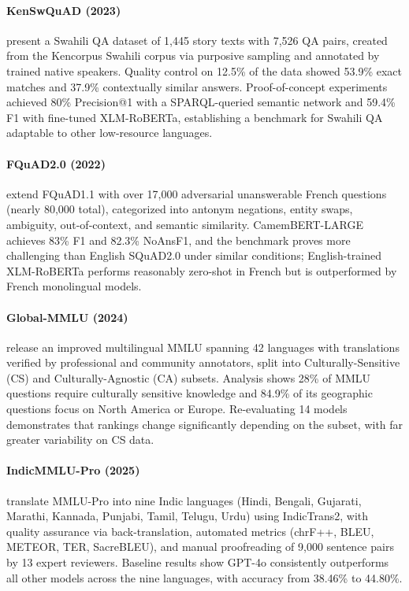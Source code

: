 \documentclass[letterpaper]{article}
\begin{document}
\paragraph{KenSwQuAD (2023)} \citet{10.1145/3578553} present a Swahili QA dataset of 1,445 story texts with 7,526 QA pairs, created from the Kencorpus Swahili corpus via purposive sampling and annotated by trained native speakers. Quality control on 12.5\% of the data showed 53.9\% exact matches and 37.9\% contextually similar answers. Proof-of-concept experiments achieved 80\% Precision@1 with a SPARQL-queried semantic network and 59.4\% F1 with fine-tuned XLM-RoBERTa, establishing a benchmark for Swahili QA adaptable to other low-resource languages.

\paragraph{FQuAD2.0 (2022)} \citet{heinrich-etal-2022-fquad2} extend FQuAD1.1 with over 17,000 adversarial unanswerable French questions (nearly 80,000 total), categorized into antonym negations, entity swaps, ambiguity, out-of-context, and semantic similarity. CamemBERT-LARGE achieves 83\% F1 and 82.3\% NoAnsF1, and the benchmark proves more challenging than English SQuAD2.0 under similar conditions; English-trained XLM-RoBERTa performs reasonably zero-shot in French but is outperformed by French monolingual models.

\paragraph{Global-MMLU (2024)} \citet{singh2024global} release an improved multilingual MMLU spanning 42 languages with translations verified by professional and community annotators, split into Culturally-Sensitive (CS) and Culturally-Agnostic (CA) subsets. Analysis shows 28\% of MMLU questions require culturally sensitive knowledge and 84.9\% of its geographic questions focus on North America or Europe. Re-evaluating 14 models demonstrates that rankings change significantly depending on the subset, with far greater variability on CS data.

\paragraph{IndicMMLU-Pro (2025)} \citet{sankalp2025indicmmlu} translate MMLU-Pro into nine Indic languages (Hindi, Bengali, Gujarati, Marathi, Kannada, Punjabi, Tamil, Telugu, Urdu) using IndicTrans2, with quality assurance via back-translation, automated metrics (chrF++, BLEU, METEOR, TER, SacreBLEU), and manual proofreading of 9,000 sentence pairs by 13 expert reviewers. Baseline results show GPT-4o consistently outperforms all other models across the nine languages, with accuracy from 38.46\% to 44.80\%.
\end{document}
